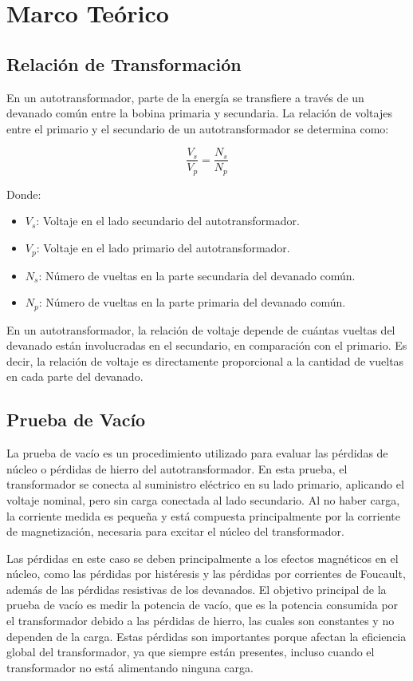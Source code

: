 \section*{Marco Teórico}

\subsection*{Relación de Transformación}

En un autotransformador, parte de la energía se transfiere a través de un devanado común entre la bobina primaria y secundaria. La relación de voltajes entre el primario y el secundario de un autotransformador se determina como:

\begin{equation}
\frac{V_s}{V_p} = \frac{N_s}{N_p}
\end{equation}

Donde:
\begin{itemize}
    \item $V_s$: Voltaje en el lado secundario del autotransformador.
    \item $V_p$: Voltaje en el lado primario del autotransformador.
    \item $N_s$: Número de vueltas en la parte secundaria del devanado común.
    \item $N_p$: Número de vueltas en la parte primaria del devanado común.
\end{itemize}

En un autotransformador, la relación de voltaje depende de cuántas vueltas del devanado están involucradas en el secundario, en comparación con el primario. Es decir, la relación de voltaje es directamente proporcional a la cantidad de vueltas en cada parte del devanado.

\subsection*{Prueba de Vacío}

La prueba de vacío es un procedimiento utilizado para evaluar las pérdidas de núcleo o pérdidas de hierro del autotransformador. En esta prueba, el transformador se conecta al suministro eléctrico en su lado primario, aplicando el voltaje nominal, pero sin carga conectada al lado secundario. Al no haber carga, la corriente medida es pequeña y está compuesta principalmente por la corriente de magnetización, necesaria para excitar el núcleo del transformador.

Las pérdidas en este caso se deben principalmente a los efectos magnéticos en el núcleo, como las pérdidas por histéresis y las pérdidas por corrientes de Foucault, además de las pérdidas resistivas de los devanados. El objetivo principal de la prueba de vacío es medir la potencia de vacío, que es la potencia consumida por el transformador debido a las pérdidas de hierro, las cuales son constantes y no dependen de la carga. Estas pérdidas son importantes porque afectan la eficiencia global del transformador, ya que siempre están presentes, incluso cuando el transformador no está alimentando ninguna carga.


